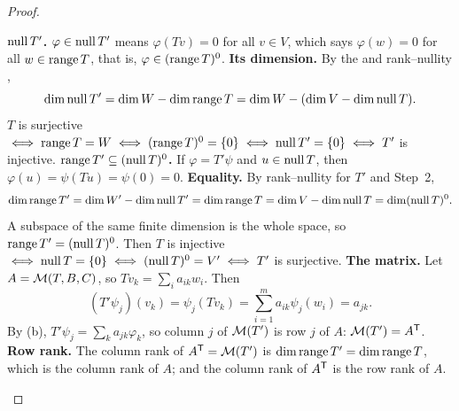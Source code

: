 \documentclass[10pt]{scrartcl}
\begin{document}
\begin{proof}
  \begin{steps}
    \ii \textbf{$\operatorname{null} T'$.} $\varphi\in\operatorname{null} T'$ means $\varphi(Tv)=0$ for all $v\in V$, which says $\varphi(w)=0$ for all $w\in\operatorname{range} T$, that is, $\varphi\in(\operatorname{range} T)^0$.
    \ii \textbf{Its dimension.} By the  and rank--nullity ,
    \[
      \dim\operatorname{null} T'=\dim W-\dim\operatorname{range} T=\dim W-(\dim V-\dim\operatorname{null} T).
    \]
    $T$ is surjective $\iff\operatorname{range} T=W\iff(\operatorname{range} T)^0=\{0\}\iff\operatorname{null} T'=\{0\}\iff T'$ is injective.
    \ii \textbf{$\operatorname{range} T'\subseteq(\operatorname{null} T)^0$.} If $\varphi=T'\psi$ and $u\in\operatorname{null} T$, then $\varphi(u)=\psi(Tu)=\psi(0)=0$.
    \ii \textbf{Equality.} By rank--nullity for $T'$ and Step~2,
    \[
      \dim\operatorname{range} T'=\dim W'-\dim\operatorname{null} T'=\dim\operatorname{range} T=\dim V-\dim\operatorname{null} T=\dim(\operatorname{null} T)^0 .
    \]
    A subspace of the same finite dimension is the whole space, so $\operatorname{range} T'=(\operatorname{null} T)^0$. Then $T$ is injective $\iff\operatorname{null} T=\{0\}\iff(\operatorname{null} T)^0=V'\iff T'$ is surjective.
    \ii \textbf{The matrix.} Let $A=\mathcal M(T,B,C)$, so $Tv_k=\sum_i a_{ik}w_i$. Then
    \[
      (T'\psi_j)(v_k)=\psi_j(Tv_k)=\sum_{i=1}^m a_{ik}\psi_j(w_i)=a_{jk}.
    \]
    By (b), $T'\psi_j=\sum_k a_{jk}\varphi_k$, so column $j$ of $\mathcal M(T')$ is row $j$ of $A$: $\mathcal M(T')=A^{\mathsf T}$.
    \ii \textbf{Row rank.} The column rank of $A^{\mathsf T}=\mathcal M(T')$ is $\dim\operatorname{range} T'=\dim\operatorname{range} T$, which is the column rank of $A$; and the column rank of $A^{\mathsf T}$ is the row rank of $A$.
  \end{steps}
\end{proof}
\end{document}
